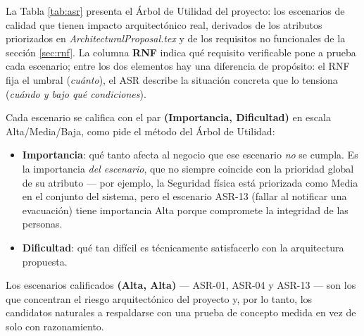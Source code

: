 \documentclass[11pt,a4paper]{article}
\begin{document}
\label{sec:asr}

La Tabla \ref{tab:asr} presenta el Árbol de Utilidad del proyecto: los escenarios de calidad que
tienen impacto arquitectónico real, derivados de los atributos priorizados en
\textit{ArchitecturalProposal.tex} y de los requisitos no funcionales de la sección
\ref{sec:rnf}. La columna \textbf{RNF} indica qué requisito verificable pone a prueba cada
escenario; entre los dos elementos hay una diferencia de propósito: el RNF fija el umbral
(\textit{cuánto}), el ASR describe la situación concreta que lo tensiona (\textit{cuándo y bajo
qué condiciones}).

Cada escenario se califica con el par \textbf{(Importancia, Dificultad)} en escala
Alta/Media/Baja, como pide el método del Árbol de Utilidad:

\begin{itemize}
  \item \textbf{Importancia}: qué tanto afecta al negocio que ese escenario \textit{no} se
  cumpla. Es la importancia \textit{del escenario}, que no siempre coincide con la prioridad
  global de su atributo --- por ejemplo, la Seguridad física está priorizada como Media en el
  conjunto del sistema, pero el escenario ASR-13 (fallar al notificar una evacuación) tiene
  importancia Alta porque compromete la integridad de las personas.
  \item \textbf{Dificultad}: qué tan difícil es técnicamente satisfacerlo con la arquitectura
  propuesta.
\end{itemize}

Los escenarios calificados \textbf{(Alta, Alta)} --- ASR-01, ASR-04 y ASR-13 --- son los que
concentran el riesgo arquitectónico del proyecto y, por lo tanto, los candidatos naturales a
respaldarse con una prueba de concepto medida en vez de solo con razonamiento.
\end{document}
